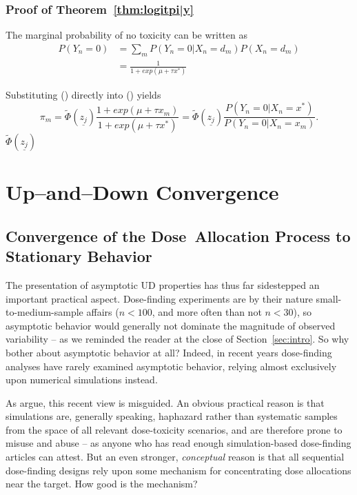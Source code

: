 \subsubsection{Proof of Theorem~\ref{thm:logitpi|y}}
The marginal probability of no toxicity can be written as
\begin{align}
P(Y_n=0)&=\sum_m P(Y_n=0|X_n=d_m)P(X_n=d_m)\\
&=\frac{1}{1+exp\left(\mu+\tau x^*\right)}
\end{align}


Substituting () directly into () yields
\begin{equation}
\pi_m=\tilde{\Phi}(\underline{z_j})\frac{1+exp\left(\mu+\tau x_m\right)}{1+exp\left(\mu+\tau x^*\right)}
=\tilde{\Phi}(\underline{z_j})\frac{P(Y_n=0|X_n=x^*)}{P(Y_n=0|X_n=x_m)}.
\end{equation}
$\tilde{\Phi}(\underline{z_j})$

\section{Up--and--Down Convergence}

\subsection{Convergence of the Dose~Allocation Process to Stationary Behavior}\label{sec:geom}

The presentation of asymptotic UD properties has thus far sidestepped an important practical aspect. Dose-finding experiments are by their nature small-to-medium-sample affairs ($n<100$, and more often than not $n<30$), so asymptotic behavior would generally not dominate the magnitude of observed variability -- as we reminded the reader at the close of Section~\ref{sec:intro}. So why bother about asymptotic behavior at all? Indeed, in recent years dose-finding analyses have rarely examined asymptotic behavior, relying almost exclusively upon numerical simulations instead.

As \cite{oron:azri:hoff:dose:2011} argue, this recent view is misguided. An obvious practical reason is that simulations are, generally speaking, haphazard rather than systematic samples from the space of all relevant dose-toxicity scenarios, and are therefore prone to misuse and abuse -- as anyone who has read enough simulation-based dose-finding articles can attest. But an even stronger,  \emph{conceptual} reason is that all sequential dose-finding designs rely upon some mechanism for concentrating dose allocations near the target. How good is the mechanism?

